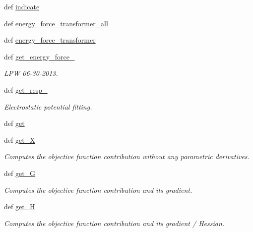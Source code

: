 \begin{DoxyCompactItemize}
def \hyperlink{classforcebalance_1_1abinitio_1_1AbInitio_a3260db78e8c174f04a64661c4e5c181c}{indicate}
\item 
def \hyperlink{classforcebalance_1_1abinitio_1_1AbInitio_a3d28520925c6dfd179647d0abf7e1368}{energy\-\_\-force\-\_\-transformer\-\_\-all}
\item 
def \hyperlink{classforcebalance_1_1abinitio_1_1AbInitio_a9167da321a9fff748eef5ebe754cc7ca}{energy\-\_\-force\-\_\-transformer}
\item 
def \hyperlink{classforcebalance_1_1abinitio_1_1AbInitio_a313c848f46579817803c8a3ff100974e}{get\-\_\-energy\-\_\-force\-\_\-}
\begin{DoxyCompactList}\small\item\em L\-P\-W 06-\/30-\/2013. \end{DoxyCompactList}\item 
def \hyperlink{classforcebalance_1_1abinitio_1_1AbInitio_abfe50569805218075c5942fd3be8bbe7}{get\-\_\-resp\-\_\-}
\begin{DoxyCompactList}\small\item\em Electrostatic potential fitting. \end{DoxyCompactList}\item 
def \hyperlink{classforcebalance_1_1abinitio_1_1AbInitio_a2bb3ed7209707f688ec8b731392466b5}{get}
\item 
def \hyperlink{classforcebalance_1_1target_1_1Target_a606dd136f195c267c05a2455405e5949}{get\-\_\-\-X}
\begin{DoxyCompactList}\small\item\em Computes the objective function contribution without any parametric derivatives. \end{DoxyCompactList}\item 
def \hyperlink{classforcebalance_1_1target_1_1Target_afa8cc38c8bba8861c072e789717aa049}{get\-\_\-\-G}
\begin{DoxyCompactList}\small\item\em Computes the objective function contribution and its gradient. \end{DoxyCompactList}\item 
def \hyperlink{classforcebalance_1_1target_1_1Target_a1d2ee27fe86a09769c1816af23b09adb}{get\-\_\-\-H}
\begin{DoxyCompactList}\small\item\em Computes the objective function contribution and its gradient / Hessian. \end{DoxyCompactList}\item 

\end{DoxyCompactItemize}
